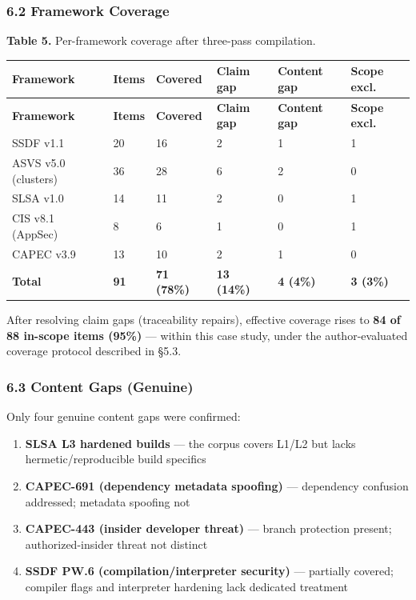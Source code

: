 \documentclass[
]{article}
\providecommand{\tightlist}{%
  \setlength{\itemsep}{0pt}\setlength{\parskip}{0pt}}
\begin{document}
\subsubsection{6.2 Framework Coverage}\label{framework-coverage}

\textbf{Table 5.} Per-framework coverage after three-pass compilation.

\begin{longtable}{@{}L{3.8cm}R{1.2cm}R{1.6cm}R{1.6cm}R{1.8cm}R{1.8cm}@{}}
\toprule
\textbf{Framework} & \textbf{Items} & \textbf{Covered} & \textbf{Claim gap} & \textbf{Content gap} & \textbf{Scope excl.} \\
\midrule
\endfirsthead
\toprule
\textbf{Framework} & \textbf{Items} & \textbf{Covered} & \textbf{Claim gap} & \textbf{Content gap} & \textbf{Scope excl.} \\
\midrule
\endhead
\bottomrule
\endfoot
\bottomrule
\endlastfoot
SSDF v1.1 & 20 & 16 & 2 & 1 & 1 \\
ASVS v5.0 (clusters) & 36 & 28 & 6 & 2 & 0 \\
SLSA v1.0 & 14 & 11 & 2 & 0 & 1 \\
CIS v8.1 (AppSec) & 8 & 6 & 1 & 0 & 1 \\
CAPEC v3.9 & 13 & 10 & 2 & 1 & 0 \\
\textbf{Total} & \textbf{91} & \textbf{71 (78\%)} & \textbf{13 (14\%)} & \textbf{4 (4\%)} & \textbf{3 (3\%)} \\
\end{longtable}

After resolving claim gaps (traceability repairs), effective coverage
rises to \textbf{84 of 88 in-scope items (95\%)} --- within this case
study, under the author-evaluated coverage protocol described in §5.3.

\subsubsection{6.3 Content Gaps (Genuine)}\label{content-gaps-genuine}

Only four genuine content gaps were confirmed:

\begin{enumerate}
\def\labelenumi{\arabic{enumi}.}
\tightlist
\item
  \textbf{SLSA L3 hardened builds} --- the corpus covers L1/L2 but lacks
  hermetic/reproducible build specifics
\item
  \textbf{CAPEC-691 (dependency metadata spoofing)} --- dependency
  confusion addressed; metadata spoofing not
\item
  \textbf{CAPEC-443 (insider developer threat)} --- branch protection
  present; authorized-insider threat not distinct
\item
  \textbf{SSDF PW.6 (compilation/interpreter security)} --- partially
  covered; compiler flags and interpreter hardening lack dedicated
  treatment
\end{enumerate}
\end{document}
